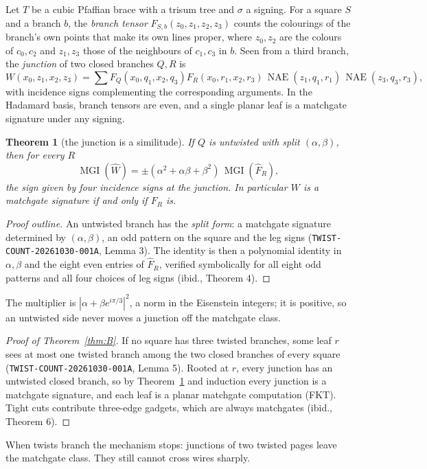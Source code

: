 \documentclass[11pt]{article}
\newtheorem{theorem}{Theorem}
\theoremstyle{definition}
\theoremstyle{remark}
\newcommand{\MGI}{\operatorname{MGI}}
\newcommand{\NAE}{\operatorname{NAE}}
\begin{document}
Let $T$ be a cubic Pfaffian brace with a trisum tree and $\sigma$ a signing.
For a square $S$ and a branch $b$, the \emph{branch tensor}
$F_{S,b}(z_0,z_1,z_2,z_3)$ counts the colourings of the branch's own points
that make its own lines proper, where $z_0,z_2$ are the colours of $c_0,c_2$
and $z_1,z_3$ those of the neighbours of $c_1,c_3$ in $b$. Seen from a third
branch, the \emph{junction} of two closed branches $Q,R$ is
\[
W(x_0,z_1,x_2,z_3)=\sum F_Q(x_0,q_1,x_2,q_3)F_R(x_0,r_1,x_2,r_3)\,
\NAE(z_1,q_1,r_1)\,\NAE(z_3,q_3,r_3),
\]
with incidence signs complementing the corresponding arguments. In the
Hadamard basis, branch tensors are even, and a single planar leaf is a
matchgate signature under any signing.

\begin{theorem}[the junction is a similitude]\label{thm:sim}
If $Q$ is untwisted with split $(\alpha,\beta)$, then for every $R$
\[
\MGI(\hat W)=\pm(\alpha^2+\alpha\beta+\beta^2)\,\MGI(\hat F_R),
\]
the sign given by four incidence signs at the junction. In particular $W$ is a
matchgate signature if and only if $F_R$ is.
\end{theorem}
\begin{proof}[Proof outline]
An untwisted branch has the \emph{split form}: a matchgate signature
determined by $(\alpha,\beta)$, an odd pattern on the square and the leg signs
(\texttt{TWIST-COUNT-20261030-001A}, Lemma 3). The identity is then a
polynomial identity in $\alpha,\beta$ and the eight even entries of
$\hat F_R$, verified symbolically for all eight odd patterns and all four
choices of leg signs (ibid., Theorem 4).
\end{proof}

The multiplier is $|\alpha+\beta e^{i\pi/3}|^2$, a norm in the Eisenstein
integers; it is positive, so an untwisted side never moves a junction off the
matchgate class.

\begin{proof}[Proof of Theorem~\ref{thm:B}]
If no square has three twisted branches, some leaf $r$ sees at most one
twisted branch among the two closed branches of every square
(\texttt{TWIST-COUNT-20261030-001A}, Lemma 5). Rooted at $r$, every junction
has an untwisted closed branch, so by Theorem~\ref{thm:sim} and induction
every junction is a matchgate signature, and each leaf is a planar matchgate
computation (FKT). Tight cuts contribute three-edge gadgets, which are always
matchgates (ibid., Theorem 6).
\end{proof}

When twists branch the mechanism stops: junctions of two twisted pages leave
the matchgate class. They still cannot cross wires sharply.
\end{document}

